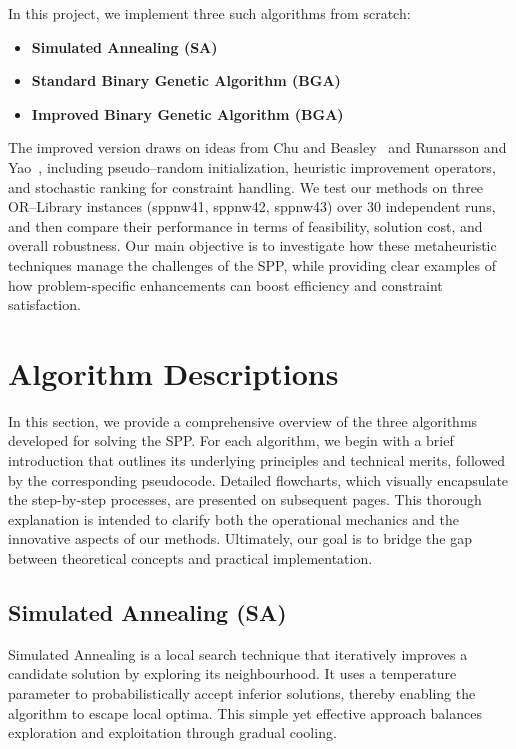 \documentclass[12pt]{article}
\begin{document}
In this project, we implement three such algorithms from scratch:
\begin{itemize}
    \item \textbf{Simulated Annealing (SA)}
    \item \textbf{Standard Binary Genetic Algorithm (BGA)}
    \item \textbf{Improved Binary Genetic Algorithm (BGA)}
\end{itemize}

The improved version draws on ideas from Chu and Beasley~\cite{ChuAndBeasley1998} and Runarsson and Yao~\cite{RunarssonYao2000}, including pseudo--random initialization, heuristic improvement operators, and stochastic ranking for constraint handling. We test our methods on three OR--Library instances (sppnw41, sppnw42, sppnw43) over 30 independent runs, and then compare their performance in terms of feasibility, solution cost, and overall robustness. Our main objective is to investigate how these metaheuristic techniques manage the challenges of the SPP, while providing clear examples of how problem-specific enhancements can boost efficiency and constraint satisfaction.

\section{Algorithm Descriptions}
\label{sec:algorithms}
In this section, we provide a comprehensive overview of the three algorithms developed for solving the SPP. For each algorithm, we begin with a brief introduction that outlines its underlying principles and technical merits, followed by the corresponding pseudocode. Detailed flowcharts, which visually encapsulate the step-by-step processes, are presented on subsequent pages. This thorough explanation is intended to clarify both the operational mechanics and the innovative aspects of our methods. Ultimately, our goal is to bridge the gap between theoretical concepts and practical implementation.

\subsection{Simulated Annealing (SA)}
Simulated Annealing is a local search technique that iteratively improves a candidate solution by exploring its neighbourhood. It uses a temperature parameter to probabilistically accept inferior solutions, thereby enabling the algorithm to escape local optima. This simple yet effective approach balances exploration and exploitation through gradual cooling.
\end{document}

